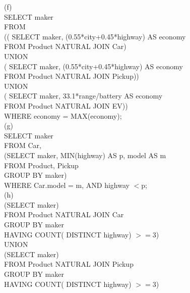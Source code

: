 \documentclass[11pt, oneside]{article}   	%
\begin{document}
(f)\\
SELECT maker\\
FROM\\
\hspace*{1cm} (( SELECT maker, (0.55*city+0.45*highway) AS economy\\
\hspace*{1cm} FROM Product NATURAL JOIN Car)\\
\hspace*{1cm} UNION\\
\hspace*{1cm}( SELECT maker, (0.55*city+0.45*highway) AS economy\\
\hspace*{1cm} FROM Product NATURAL JOIN Pickup))\\
\hspace*{1cm} UNION\\
\hspace*{1cm}( SELECT maker, 33.1*range/battery AS economy\\
\hspace*{1cm} FROM Product NATURAL JOIN EV))\\
WHERE economy = MAX(economy);\\

(g)\\
SELECT maker\\
FROM Car,\\
\hspace*{1cm} (SELECT maker, MIN(highway) AS p, model AS m\\
\hspace*{1cm}  FROM Product, Pickup\\
\hspace*{1cm}  GROUP BY maker)\\
WHERE Car.model = m, AND highway $<$p;\\

(h)\\
(SELECT maker)\\
FROM Product NATURAL JOIN Car\\
GROUP BY maker\\
HAVING COUNT( DISTINCT highway) $>=3$)\\
UNION\\
(SELECT maker)\\
FROM Product NATURAL JOIN Pickup\\
GROUP BY maker\\
HAVING COUNT( DISTINCT highway) $>=3$)\\
\end{document}
